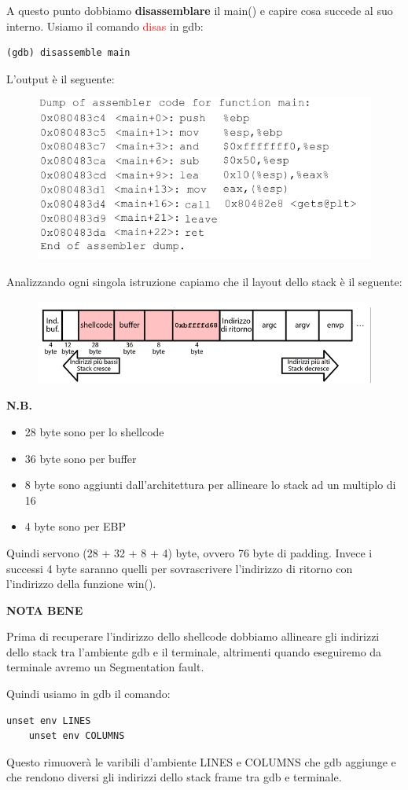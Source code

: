 A questo punto dobbiamo \textbf{disassemblare} il main() e capire cosa succede al suo interno. Usiamo il comando \textcolor{red}{disas} in gdb:
\begin{lstlisting}[style=bashstyle]
    (gdb) disassemble main
\end{lstlisting}
L'output è il seguente:
\begin{figure}[ht]
    \includegraphics[width=\textwidth]{Capitolo 3/Figure/disas-main-stack5.png}
\end{figure}

Analizzando ogni singola istruzione capiamo che il layout dello stack è il seguente:
\begin{figure}[ht]
    \includegraphics[width=\textwidth]{Capitolo 3/Figure/layout-stack5.png}
\end{figure}

\clearpage
\textbf{N.B.}\begin{itemize}
    \item 28 byte sono per lo shellcode
    \item 36 byte sono per buffer
    \item 8 byte sono aggiunti dall'architettura per allineare lo stack ad un multiplo di 16
    \item 4 byte sono per EBP
\end{itemize}
Quindi servono (28 + 32 + 8 + 4) byte, ovvero 76 byte di padding. Invece i successi 4 byte saranno quelli per sovrascrivere l'indirizzo di ritorno con l'indirizzo della funzione win().

\textbf{NOTA BENE}
\begin{mdframed}[backgroundcolor=gray!10,linewidth=1pt]
Prima di recuperare l'indirizzo dello shellcode dobbiamo allineare gli indirizzi dello stack tra l'ambiente gdb e il terminale, altrimenti quando eseguiremo da terminale avremo un Segmentation fault.

Quindi usiamo in gdb il comando:
\begin{lstlisting}[style=bashstyle]
    unset env LINES
    unset env COLUMNS
\end{lstlisting}
Questo rimuoverà le varibili d'ambiente LINES e COLUMNS che gdb aggiunge e che rendono diversi gli indirizzi dello stack frame tra gdb e terminale.
\end{mdframed}

